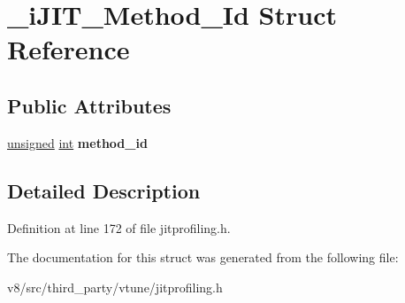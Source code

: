 \hypertarget{struct__iJIT__Method__Id}{}\section{\+\_\+i\+J\+I\+T\+\_\+\+Method\+\_\+\+Id Struct Reference}
\label{struct__iJIT__Method__Id}
\subsection*{Public Attributes}
\begin{DoxyCompactItemize}
\item 
\mbox{\label{struct__iJIT__Method__Id_a93a5f82a1b62815844a2b8565fcf947a}} 
\mbox{\hyperlink{classunsigned}{unsigned}} \mbox{\hyperlink{classint}{int}} {\bfseries method\+\_\+id}
\end{DoxyCompactItemize}


\subsection{Detailed Description}


Definition at line 172 of file jitprofiling.\+h.



The documentation for this struct was generated from the following file\+:\begin{DoxyCompactItemize}
\item 
v8/src/third\+\_\+party/vtune/jitprofiling.\+h\end{DoxyCompactItemize}
